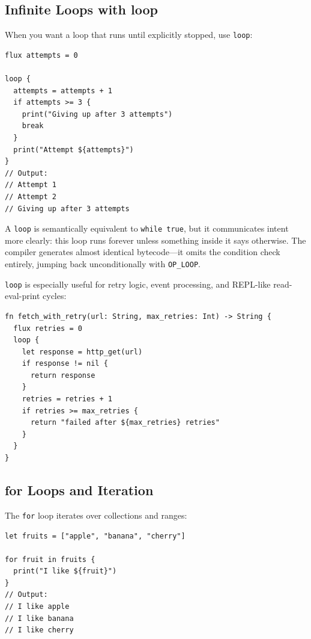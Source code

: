 \subsection{Infinite Loops with loop}\label{sec:loop-keyword}

When you want a loop that runs until explicitly stopped, use \lstinline|loop|:

\begin{lstlisting}[language=Lattice, caption={An infinite loop with break}]
flux attempts = 0

loop {
  attempts = attempts + 1
  if attempts >= 3 {
    print("Giving up after 3 attempts")
    break
  }
  print("Attempt ${attempts}")
}
// Output:
// Attempt 1
// Attempt 2
// Giving up after 3 attempts
\end{lstlisting}

A \lstinline|loop| is semantically equivalent to \lstinline|while true|, but it communicates intent more clearly: this loop runs forever unless something inside it says otherwise. The compiler generates almost identical bytecode---it omits the condition check entirely, jumping back unconditionally with \lstinline|OP_LOOP|.

\lstinline|loop| is especially useful for retry logic, event processing, and REPL-like read-eval-print cycles:

\begin{lstlisting}[language=Lattice, caption={A retry pattern with loop}]
fn fetch_with_retry(url: String, max_retries: Int) -> String {
  flux retries = 0
  loop {
    let response = http_get(url)
    if response != nil {
      return response
    }
    retries = retries + 1
    if retries >= max_retries {
      return "failed after ${max_retries} retries"
    }
  }
}
\end{lstlisting}

\subsection{for Loops and Iteration}\label{sec:for-loops}

The \lstinline|for| loop iterates over collections and ranges:

\begin{lstlisting}[language=Lattice, caption={Iterating over an array}]
let fruits = ["apple", "banana", "cherry"]

for fruit in fruits {
  print("I like ${fruit}")
}
// Output:
// I like apple
// I like banana
// I like cherry
\end{lstlisting}

